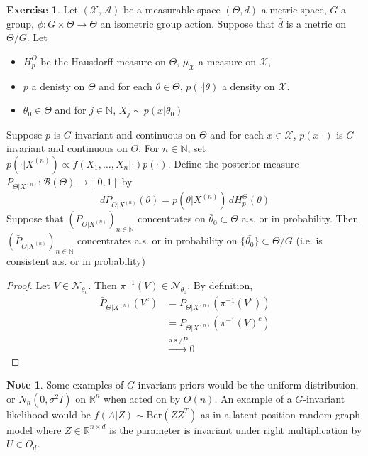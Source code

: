 \documentclass[12pt]{amsart}
\theoremstyle{definition}
\newtheorem{note}[definition]{Note}
\newtheorem{ex}[definition]{Exercise}
\newcommand{\sig}{\sigma}
\newcommand{\N}{\mathbb{N}}
\newcommand{\R}{\mathbb{R}}
\newcommand{\MA}{\mathcal{A}}
\newcommand{\MB}{\mathcal{B}}
\newcommand{\MN}{\mathcal{N}}
\newcommand{\MX}{\mathcal{X}}
\newcommand{\convt}[1]{\xrightarrow{\text{#1}}}
\begin{document}
	\begin{ex}
	Let $(\MX, \MA)$ be a measurable space $(\Theta, d)$ a metric space, $G$ a group, $\phi: G \times \Theta \rightarrow \Theta$ an isometric group action. Suppose that $\bar{d}$ is a metric on $\Theta / G$. Let 
	\begin{itemize}
	\item $H_p^{\Theta}$ be the Hausdorff measure on $\Theta$, $\mu_{\MX}$ a measure on $\MX$, 
	\item $p$ a denisty on $\Theta$ and for each $\theta \in \Theta$, $p(\cdot|\theta)$ a density on $\MX$. 
	\item $\theta_0 \in \Theta$ and for $j \in \N$, $X_j \sim p(x|\theta_0)$
	\end{itemize}
	Suppose $p$ is $G$-invariant and continuous on $\Theta$ and for each $x \in \MX$, $p(x| \cdot)$ is $G$-invariant and continuous on $\Theta$. For $n \in \N$, set $p(\cdot|X^{(n)}) \propto f(X_1, \ldots, X_n| \cdot) p(\cdot)$. Define the posterior measure $P_{\Theta|X^{(n)}}: \MB(\Theta) \rightarrow [0, 1]$ by 
	\begin{equation*}
	d P_{\Theta|X^{(n)}} (\theta) = p(\theta |X^{(n)}) \, dH_p^{\Theta} (\theta)
	\end{equation*}
	Suppose that $(P_{\Theta|X^{(n)}})_{n \in \N}$ concentrates on $\bar{\theta}_0 \subset \Theta$ a.s. or in probability. Then $(\bar{P}_{\Theta|X^{(n)}})_{n \in \N}$ concentrates a.s. or in probability on $\{\bar{\theta_0}\} \subset \Theta / G$ (i.e. is consistent a.s. or in probability)
	\end{ex}
	
	\begin{proof}
	Let $V \in \MN_{\bar{\theta}_0}$. Then $\pi^{-1}(V) \in \MN_{\bar{\theta}_0}$. By definition, 
	\begin{align*}
	\bar{P}_{\Theta|X^{(n)}}(V^c)
	&= P_{\Theta|X^{(n)}}(\pi^{-1}(V^c)) \\
	&= P_{\Theta|X^{(n)}}(\pi^{-1}(V)^c) \\
	&\convt{a.s./$P$} 0 
	\end{align*}
	\end{proof}
	
	\begin{note}
	Some examples of $G$-invariant priors would be the uniform distribution, or $N_n(0, \sig^2I)$ on $\R^n$ when acted on by $O(n)$. An example of a $G$-invariant likelihood would be $f(A|Z) \sim \text{Ber}(ZZ^T)$ as in a latent position random graph model where $Z \in \R^{n \times d}$ is the parameter is invariant under right multiplication by $U \in O_d$.
	\end{note}
	
\end{document}
